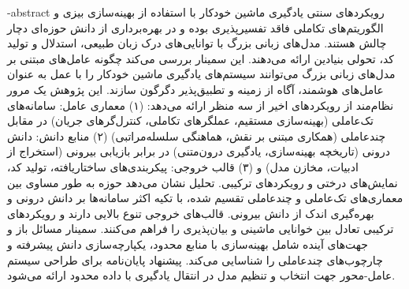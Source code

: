 \fa-abstract{
    رویکردهای سنتی یادگیری ماشین خودکار با استفاده از بهینه‌سازی بیزی و الگوریتم‌های تکاملی فاقد تفسیرپذیری بوده و در بهره‌برداری از دانش حوزه‌ای دچار چالش هستند. مدل‌های زبانی بزرگ با توانایی‌های درک زبان طبیعی، استدلال و تولید کد، تحولی بنیادین ارائه می‌دهند. این سمینار بررسی می‌کند چگونه عامل‌های مبتنی بر مدل‌های زبانی بزرگ می‌توانند سیستم‌های یادگیری ماشین خودکار را با عمل به عنوان عامل‌های هوشمند، آگاه از زمینه و تطبیق‌پذیر دگرگون سازند. این پژوهش یک مرور نظام‌مند از رویکردهای اخیر از سه منظر ارائه می‌دهد: (۱) معماری عامل: سامانه‌های تک‌عاملی (بهینه‌سازی مستقیم، عملگرهای تکاملی، کنترل‌گرهای جریان) در مقابل چندعاملی (همکاری مبتنی بر نقش، هماهنگی سلسله‌مراتبی) (۲) منابع دانش: دانش درونی (تاریخچه بهینه‌سازی، یادگیری درون‌متنی) در برابر بازیابی بیرونی (استخراج از ادبیات، مخازن مدل) و (۳) قالب خروجی: پیکربندی‌های ساختاریافته، تولید کد، نمایش‌های درختی و رویکردهای ترکیبی. تحلیل نشان می‌دهد حوزه به طور مساوی بین معماری‌های تک‌عاملی و چندعاملی تقسیم شده، با تکیه اکثر سامانه‌ها بر دانش درونی و بهره‌گیری اندک از دانش بیرونی. قالب‌های خروجی تنوع بالایی دارند و رویکردهای ترکیبی تعادل بین خوانایی ماشینی و بیان‌پذیری را فراهم می‌کنند. سمینار مسائل باز و جهت‌های آینده شامل بهینه‌سازی با منابع محدود، یکپارچه‌سازی دانش پیشرفته و چارچوب‌های چندعاملی را شناسایی می‌کند. پیشنهاد پایان‌نامه برای طراحی سیستم عامل-محور جهت انتخاب و تنظیم مدل در انتقال یادگیری با داده محدود ارائه می‌شود.
}
\abstractPage
\newpage\clearpage